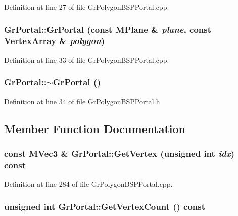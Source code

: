 Definition at line 27 of file GrPolygonBSPPortal.cpp.\hypertarget{class_gr_portal_e2b9de45071c5699887f9b0f4f3e6496}{
\subsubsection[{GrPortal}]{\setlength{\rightskip}{0pt plus 5cm}GrPortal::GrPortal (const {\bf MPlane} \& {\em plane}, \/  const {\bf VertexArray} \& {\em polygon})}}
\label{class_gr_portal_e2b9de45071c5699887f9b0f4f3e6496}




Definition at line 33 of file GrPolygonBSPPortal.cpp.\hypertarget{class_gr_portal_ef1e70041f3deb5646b306493a93f0d3}{
\subsubsection[{$\sim$GrPortal}]{\setlength{\rightskip}{0pt plus 5cm}GrPortal::$\sim$GrPortal ()}}
\label{class_gr_portal_ef1e70041f3deb5646b306493a93f0d3}




Definition at line 34 of file GrPolygonBSPPortal.h.

\subsection{Member Function Documentation}
\hypertarget{class_gr_portal_b03b8fbf1a5ab6f367cd880c81d70854}{
\subsubsection[{GetVertex}]{\setlength{\rightskip}{0pt plus 5cm}const {\bf MVec3} \& GrPortal::GetVertex (unsigned int {\em idx}) const}}
\label{class_gr_portal_b03b8fbf1a5ab6f367cd880c81d70854}




Definition at line 284 of file GrPolygonBSPPortal.cpp.\hypertarget{class_gr_portal_c0d550bb52043d3e5c410f07cc6cd265}{
\subsubsection[{GetVertexCount}]{\setlength{\rightskip}{0pt plus 5cm}unsigned int GrPortal::GetVertexCount () const}}
\label{class_gr_portal_c0d550bb52043d3e5c410f07cc6cd265}




